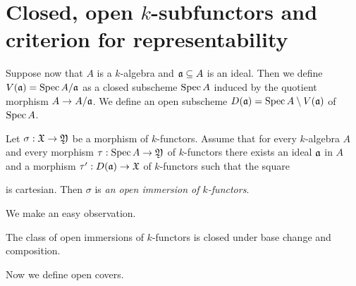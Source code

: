 \section{Closed, open $k$-subfunctors and criterion for representability}
\noindent
Suppose now that $A$ is a $k$-algebra and $\mathfrak{a}\subseteq A$ is an ideal. Then we define $V(\mathfrak{a}) = \mathrm{Spec}\, A/\mathfrak{a}$ as a closed subscheme $\mathrm{Spec}\, A$ induced by the quotient morphism $A\rightarrow A/\mathfrak{a}$. We define an open subscheme $D(\mathfrak{a}) = \mathrm{Spec}\, A\setminus V(\mathfrak{a})$ of $\mathrm{Spec}\, A$.

\begin{definition}
Let $\sigma:{\mathfrak X}\rightarrow {\mathfrak Y}$ be a morphism of $k$-functors. Assume that for every $k$-algebra $A$ and every morphism $\tau:\mathrm{Spec}\, A \rightarrow {\mathfrak Y}$ of $k$-functors there exists an ideal $\mathfrak{a}$ in $A$ and a morphism $\tau':D(\mathfrak{a})\rightarrow {\mathfrak X}$ of $k$-functors such that the square
\begin{center}
\end{center}
is cartesian. Then $\sigma$ is \textit{an open immersion of $k$-functors}.
\end{definition}
\noindent
We make an easy observation.

\begin{fact}\label{fact:open_immersions_are_closed_under_base_change_and_composition}
The class of open immersions of $k$-functors is closed under base change and composition.
\end{fact}
\noindent
Now we define open covers.

